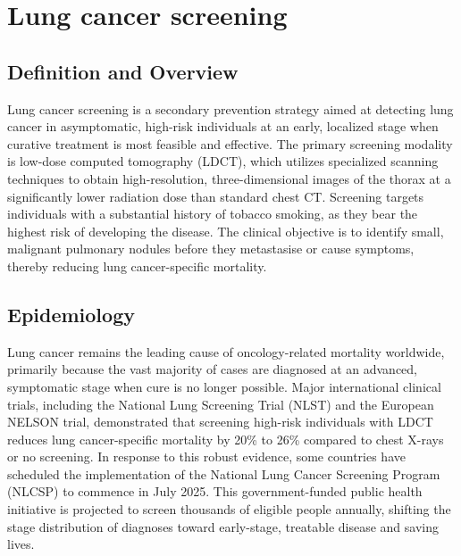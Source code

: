 \chapter{Lung cancer screening}

\section*{Definition and Overview}
Lung cancer screening is a secondary prevention strategy aimed at detecting lung cancer in asymptomatic, high-risk individuals at an early, localized stage when curative treatment is most feasible and effective. The primary screening modality is low-dose computed tomography (LDCT), which utilizes specialized scanning techniques to obtain high-resolution, three-dimensional images of the thorax at a significantly lower radiation dose than standard chest CT. Screening targets individuals with a substantial history of tobacco smoking, as they bear the highest risk of developing the disease. The clinical objective is to identify small, malignant pulmonary nodules before they metastasise or cause symptoms, thereby reducing lung cancer-specific mortality.

\section*{Epidemiology}
Lung cancer remains the leading cause of oncology-related mortality worldwide, primarily because the vast majority of cases are diagnosed at an advanced, symptomatic stage when cure is no longer possible. Major international clinical trials, including the National Lung Screening Trial (NLST) and the European NELSON trial, demonstrated that screening high-risk individuals with LDCT reduces lung cancer-specific mortality by 20\% to 26\% compared to chest X-rays or no screening. In response to this robust evidence, some countries have scheduled the implementation of the National Lung Cancer Screening Program (NLCSP) to commence in July 2025. This government-funded public health initiative is projected to screen thousands of eligible people annually, shifting the stage distribution of diagnoses toward early-stage, treatable disease and saving lives.

